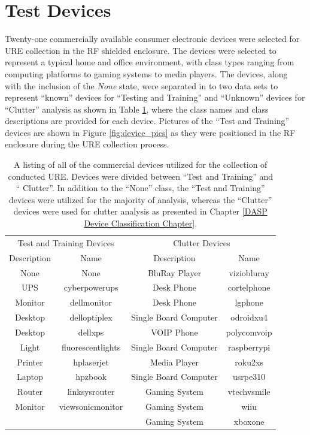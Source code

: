 \section[Test Devices]{Test Devices}

Twenty-one commercially available consumer electronic devices were selected for URE collection in the RF shielded enclosure.  The devices were selected to represent a typical home and office environment, with class types ranging from computing platforms to gaming systems to media players.  The devices, along with the inclusion of the \textit{None} state, were separated in to two data sets to represent ``known'' devices for ``Testing and Training'' and ``Unknown'' devices for ``Clutter'' analysis as shown in Table \ref{tab:collection_devices}, where the class names and class descriptions are provided for each device.  Pictures of the ``Test and Training'' devices are shown in Figure \ref{fig:device_pics} as they were positioned in the RF enclosure during the URE collection process.

\begin{table}[tb]
	\caption{A listing of all of the commercial devices utilized for the collection of conducted URE.  Devices were divided between ``Test and Training'' and ``	Clutter''.  In addition to the ``None'' class, the ``Test and Training'' devices were utilized for the majority of analysis, whereas the ``Clutter'' devices were used for clutter analysis as presented in Chapter \ref{DASP Device Classification Chapter}.}
	\centering
		\begin{tabular}{cc|cc}
		\hline
		\multicolumn{2}{c}{Test and Training Devices} & \multicolumn{2}{c}{Clutter Devices} \\
		Description & Name & Description & Name\\
		\hline
    None & None & BluRay Player & viziobluray \\
		UPS & cyberpowerups & Desk Phone & cortelphone \\
		Monitor & dellmonitor & Desk Phone & lgphone \\
		Desktop & delloptiplex & Single Board Computer & odroidxu4 \\
		Desktop & dellxps & VOIP Phone & polycomvoip \\
		Light & fluorescentlights & Single Board Computer & raspberrypi \\
		Printer & hplaserjet & Media Player & roku2xs \\
		Laptop & hpzbook & Single Board Computer & usrpe310 \\
		Router & linksysrouter & Gaming System & vtechvsmile \\
		Monitor & viewsonicmonitor & Gaming System & wiiu\\
		& & Gaming System & xboxone\\
    \hline
		\end{tabular}

	\label{tab:collection_devices}
\end{table}

